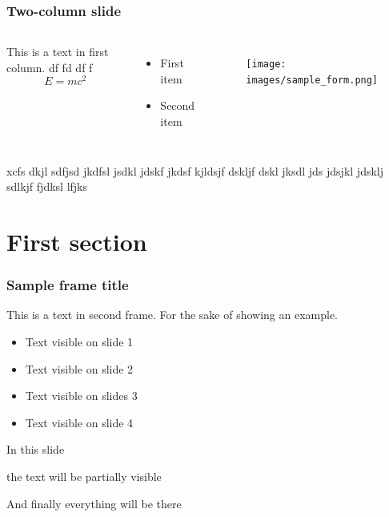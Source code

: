\documentclass[9pt]{beamer}
\begin{document}
\begin{frame}
	\frametitle{Two-column slide}
	
	\begin{columns}
		
		This is a text in first column. df fd df f
		$$E=mc^2$$
		\begin{itemize}
			\item First item
			\item Second item
		\end{itemize}
		
		
		
		\begin{figure}[!h]
			\centering
			\texttt{[image: images/sample\_form.png]}
		\end{figure}
		
	\end{columns}
	xcfs dkjl sdfjsd jkdfsl jsdkl jdskf jkdsf kjldsjf dskljf dskl jksdl jds jdsjkl jdsklj sdlkjf fjdksl lfjks
\end{frame}


\section{First section}

\begin{frame}
	\frametitle{Sample frame title}
	This is a text in second frame. For the sake of showing an example.
	
	\begin{itemize}
		\item<1-> Text visible on slide 1
		\item<2-> Text visible on slide 2
		\item<3> Text visible on slides 3
		\item<4-> Text visible on slide 4
	\end{itemize}
\end{frame}



\begin{frame}
	In this slide \pause
	
	the text will be partially visible \pause
	
	And finally everything will be there
\end{frame}
\end{document}
